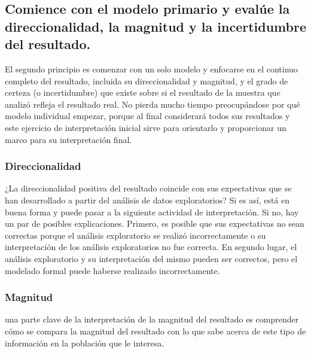 \documentclass[10pt]{book}
\begin{document}
	\subsection{Comience con el modelo primario y evalúe la direccionalidad, la magnitud y la incertidumbre del resultado.}
	El segundo principio es comenzar con un solo modelo y enfocarse en el continuo completo del resultado, incluida su direccionalidad y magnitud, y el grado de certeza (o incertidumbre) que existe sobre si el resultado de la muestra que analizó refleja el resultado real. No pierda mucho tiempo preocupándose por qué modelo individual empezar, porque al final considerará todos sus resultados y este ejercicio de interpretación inicial sirve para orientarlo y proporcionar un marco para su interpretación final.
	    \subsubsection{Direccionalidad}
	    ¿La direccionalidad positiva del resultado coincide con sus expectativas que se han desarrollado a partir del análisis de datos exploratorios? Si es así, está en buena forma y puede pasar a la siguiente actividad de interpretación. Si no, hay un par de posibles explicaciones. Primero, es posible que sus expectativas no sean correctas porque el análisis exploratorio se realizó incorrectamente o su interpretación de los análisis exploratorios no fue correcta. En segundo lugar, el análisis exploratorio y su interpretación del mismo pueden ser correctos, pero el modelado formal puede haberse realizado incorrectamente.
	    \subsubsection{Magnitud}
	    una parte clave de la interpretación de la magnitud del resultado es comprender cómo se compara la magnitud del resultado con lo que sabe acerca de este tipo de información en la población que le interesa.
\end{document}
